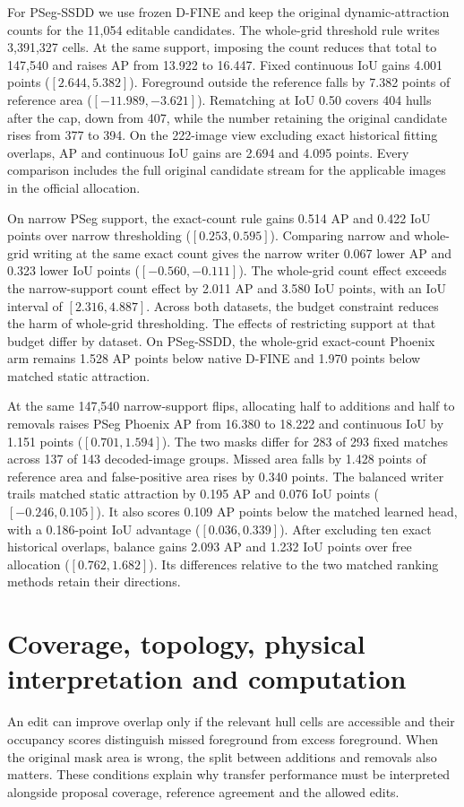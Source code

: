 \documentclass[journal]{IEEEtran}
\begin{document}
For PSeg-SSDD we use frozen D-FINE and keep the original dynamic-attraction counts for the 11,054 editable candidates. The whole-grid threshold rule writes 3,391,327 cells. At the same support, imposing the count reduces that total to 147,540 and raises AP from 13.922 to 16.447. Fixed continuous IoU gains 4.001 points (\([2.644,5.382]\)). Foreground outside the reference falls by 7.382 points of reference area (\([-11.989,-3.621]\)). Rematching at IoU 0.50 covers 404 hulls after the cap, down from 407, while the number retaining the original candidate rises from 377 to 394. On the 222-image view excluding exact historical fitting overlaps, AP and continuous IoU gains are 2.694 and 4.095 points. Every comparison includes the full original candidate stream for the applicable images in the official allocation.

On narrow PSeg support, the exact-count rule gains 0.514 AP and 0.422 IoU points over narrow thresholding (\([0.253,0.595]\)). Comparing narrow and whole-grid writing at the same exact count gives the narrow writer 0.067 lower AP and 0.323 lower IoU points (\([-0.560,-0.111]\)). The whole-grid count effect exceeds the narrow-support count effect by 2.011 AP and 3.580 IoU points, with an IoU interval of \([2.316,4.887]\). Across both datasets, the budget constraint reduces the harm of whole-grid thresholding. The effects of restricting support at that budget differ by dataset. On PSeg-SSDD, the whole-grid exact-count Phoenix arm remains 1.528 AP points below native D-FINE and 1.970 points below matched static attraction.

At the same 147,540 narrow-support flips, allocating half to additions and half to removals raises PSeg Phoenix AP from 16.380 to 18.222 and continuous IoU by 1.151 points (\([0.701,1.594]\)). The two masks differ for 283 of 293 fixed matches across 137 of 143 decoded-image groups. Missed area falls by 1.428 points of reference area and false-positive area rises by 0.340 points. The balanced writer trails matched static attraction by 0.195 AP and 0.076 IoU points (\([-0.246,0.105]\)). It also scores 0.109 AP points below the matched learned head, with a 0.186-point IoU advantage (\([0.036,0.339]\)). After excluding ten exact historical overlaps, balance gains 2.093 AP and 1.232 IoU points over free allocation (\([0.762,1.682]\)). Its differences relative to the two matched ranking methods retain their directions.

\section{Coverage, topology, physical interpretation and computation}
An edit can improve overlap only if the relevant hull cells are accessible and their occupancy scores distinguish missed foreground from excess foreground. When the original mask area is wrong, the split between additions and removals also matters. These conditions explain why transfer performance must be interpreted alongside proposal coverage, reference agreement and the allowed edits.
\end{document}
